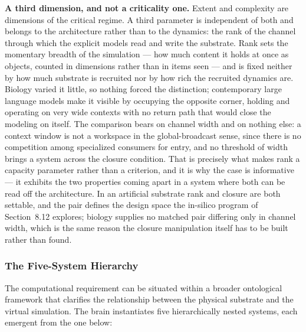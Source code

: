 \documentclass[12pt]{article}
\begin{document}
\textbf{A third dimension, and not a criticality one.} Extent and complexity are dimensions of the critical regime. A third parameter is independent of both and belongs to the architecture rather than to the dynamics: the rank of the channel through which the explicit models read and write the substrate. Rank sets the momentary breadth of the simulation --- how much content it holds at once as objects, counted in dimensions rather than in items seen --- and is fixed neither by how much substrate is recruited nor by how rich the recruited dynamics are. Biology varied it little, so nothing forced the distinction; contemporary large language models make it visible by occupying the opposite corner, holding and operating on very wide contexts with no return path that would close the modeling on itself. The comparison bears on channel width and on nothing else: a context window is not a workspace in the global-broadcast sense, since there is no competition among specialized consumers for entry, and no threshold of width brings a system across the closure condition. That is precisely what makes rank a capacity parameter rather than a criterion, and it is why the case is informative --- it exhibits the two properties coming apart in a system where both can be read off the architecture. In an artificial substrate rank and closure are both settable, and the pair defines the design space the in-silico program of Section~8.12 explores; biology supplies no matched pair differing only in channel width, which is the same reason the closure manipulation itself has to be built rather than found.

\subsubsection{The Five-System Hierarchy}

The computational requirement can be situated within a broader ontological framework that clarifies the relationship between the physical substrate and the virtual simulation. The brain instantiates five hierarchically nested systems, each emergent from the one below:
\end{document}
